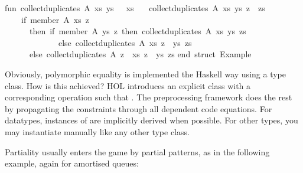 \begin{isabellebody}
\begin{isamarkuptext}
\isanewline
fun\ collect{\isacharunderscore}duplicates\ A{\isacharunderscore}\ xs\ ys\ {\isacharbrackleft}{\isacharbrackright}\ {\isacharequal}\ xs\isanewline
\ \ {\isacharbar}\ collect{\isacharunderscore}duplicates\ A{\isacharunderscore}\ xs\ ys\ {\isacharparenleft}z\ {\isacharcolon}{\isacharcolon}\ zs{\isacharparenright}\ {\isacharequal}\isanewline
\ \ \ \ {\isacharparenleft}if\ member\ A{\isacharunderscore}\ xs\ z\isanewline
\ \ \ \ \ \ then\ {\isacharparenleft}if\ member\ A{\isacharunderscore}\ ys\ z\ then\ collect{\isacharunderscore}duplicates\ A{\isacharunderscore}\ xs\ ys\ zs\isanewline
\ \ \ \ \ \ \ \ \ \ \ \ \ else\ collect{\isacharunderscore}duplicates\ A{\isacharunderscore}\ xs\ {\isacharparenleft}z\ {\isacharcolon}{\isacharcolon}\ ys{\isacharparenright}\ zs{\isacharparenright}\isanewline
\ \ \ \ \ \ else\ collect{\isacharunderscore}duplicates\ A{\isacharunderscore}\ {\isacharparenleft}z\ {\isacharcolon}{\isacharcolon}\ xs{\isacharparenright}\ {\isacharparenleft}z\ {\isacharcolon}{\isacharcolon}\ ys{\isacharparenright}\ zs{\isacharparenright}{\isacharsemicolon}\isanewline
\isanewline
end{\isacharsemicolon}\ {\isacharparenleft}{\isacharasterisk}struct\ Example{\isacharasterisk}{\isacharparenright}\isanewline%
\end{isamarkuptext}%
\isamarkuptrue%
%
\endisatagtypewriter
{\isafoldtypewriter}%
%
\isadelimtypewriter
%
\endisadelimtypewriter
%
\begin{isamarkuptext}%
\noindent Obviously, polymorphic equality is implemented the Haskell
  way using a type class.  How is this achieved?  HOL introduces an
  explicit class  with a corresponding operation  such that .  The preprocessing
  framework does the rest by propagating the  constraints
  through all dependent code equations.  For datatypes, instances of
   are implicitly derived when possible.  For other types,
  you may instantiate  manually like any other type class.%
\end{isamarkuptext}%
\isamarkuptrue%
%
\isamarkuptrue%
%
\begin{isamarkuptext}%
Partiality usually enters the game by partial patterns, as
  in the following example, again for amortised queues:%
\end{isamarkuptext}%
\isamarkuptrue%
%
\isadelimquote
%
\endisadelimquote
%
\isatagquote
{}\isamarkupfalse%

\end{isabellebody}

